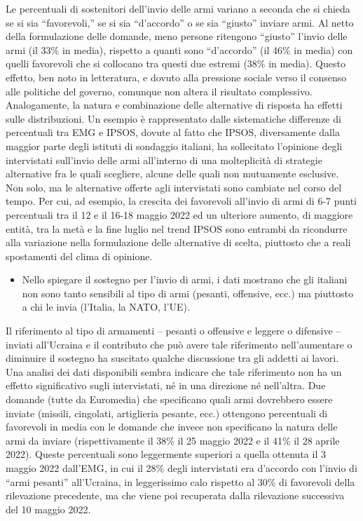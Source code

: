 \documentclass[
]{book}
\providecommand{\tightlist}{%
  \setlength{\itemsep}{0pt}\setlength{\parskip}{0pt}}
\begin{document}
Le percentuali di sostenitori dell'invio delle armi variano a seconda che si chieda se si sia ``favorevoli,'' se si sia ``d'accordo'' o se sia ``giusto'' inviare armi. Al netto della formulazione delle domande, meno persone ritengono ``giusto'' l'invio delle armi (il 33\% in media), rispetto a quanti sono ``d'accordo'' (il 46\% in media) con quelli favorevoli che si collocano tra questi due estremi (38\% in media). Questo effetto, ben noto in letteratura, e dovuto alla pressione sociale verso il consenso alle politiche del governo, comunque non altera il risultato complessivo. Analogamente, la natura e combinazione delle alternative di risposta ha effetti sulle distribuzioni. Un esempio è rappresentato dalle sistematiche differenze di percentuali tra EMG e IPSOS, dovute al fatto che IPSOS, diversamente dalla maggior parte degli istituti di sondaggio italiani, ha sollecitato l'opinione degli intervistati sull'invio delle armi all'interno di una molteplicità di strategie alternative fra le quali scegliere, alcune delle quali non mutuamente esclusive. Non solo, ma le alternative offerte agli intervistati sono cambiate nel corso del tempo. Per cui, ad esempio, la crescita dei favorevoli all'invio di armi di 6-7 punti percentuali tra il 12 e il 16-18 maggio 2022 ed un ulteriore aumento, di maggiore entità, tra la metà e la fine luglio nel trend IPSOS sono entrambi da ricondurre alla variazione nella formulazione delle alternative di scelta, piuttosto che a reali spostamenti del clima di opinione.

\begin{itemize}
\tightlist
\item
  Nello spiegare il sostegno per l'invio di armi, i dati mostrano che gli italiani non sono tanto sensibili al tipo di armi (pesanti, offensive, ecc.) ma piuttosto a chi le invia (l'Italia, la NATO, l'UE).
\end{itemize}

Il riferimento al tipo di armamenti -- pesanti o offensive e leggere o difensive -- inviati all'Ucraina e il contributo che può avere tale riferimento nell'aumentare o diminuire il sostegno ha suscitato qualche discussione tra gli addetti ai lavori. Una analisi dei dati disponibili sembra indicare che tale riferimento non ha un effetto significativo sugli intervistati, né in una direzione né nell'altra. Due domande (tutte da Euromedia) che specificano quali armi dovrebbero essere inviate (missili, cingolati, artiglieria pesante, ecc.) ottengono percentuali di favorevoli in media con le domande che invece non specificano la natura delle armi da inviare (rispettivamente il 38\% il 25 maggio 2022 e il 41\% il 28 aprile 2022). Queste percentuali sono leggermente superiori a quella ottenuta il 3 maggio 2022 dall'EMG, in cui il 28\% degli intervistati era d'accordo con l'invio di ``armi pesanti'' all'Ucraina, in leggerissimo calo rispetto al 30\% di favorevoli della rilevazione precedente, ma che viene poi recuperata dalla rilevazione successiva del 10 maggio 2022.
\end{document}

